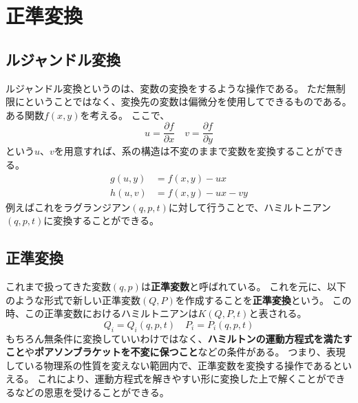 \documentclass[a4paper]{jsreport}
\begin{document}
    \chapter{正準変換}
        \section{ルジャンドル変換}
            ルジャンドル変換というのは、変数の変換をするような操作である。
            ただ無制限にということではなく、変換先の変数は偏微分を使用してできるものである。
            ある関数$f(x, y)$を考える。
            ここで、
            \begin{equation}
                u = \frac{\partial f}{\partial x} \quad v = \frac{\partial f}{\partial y}
            \end{equation}
            という$u$、$v$を用意すれば、系の構造は不変のままで変数を変換することができる。
            \begin{align}
                g(u, y) &= f(x, y) - ux \\
                h(u, v) &= f(x, y) - ux - vy
            \end{align}
            例えばこれをラグランジアン$(q, p, t)$に対して行うことで、ハミルトニアン$(q, p, t)$に変換することができる。

        \section{正準変換}
            これまで扱ってきた変数$(q, p)$は\textbf{正準変数}と呼ばれている。
            これを元に、以下のような形式で新しい正準変数$(Q, P)$を作成することを\textbf{正準変換}という。
            この時、この正準変数におけるハミルトニアンは$K(Q, P, t)$と表される。
            \begin{equation}
                Q_i = Q_i(q, p, t) \quad P_i = P_i(q, p, t)
            \end{equation}
            もちろん無条件に変換していいわけではなく、\textbf{ハミルトンの運動方程式を満たすこと}や\textbf{ポアソンブラケットを不変に保つこと}などの条件がある。
            つまり、表現している物理系の性質を変えない範囲内で、正準変数を変換する操作であるといえる。
            これにより、運動方程式を解きやすい形に変換した上で解くことができるなどの恩恵を受けることができる。
\end{document}
